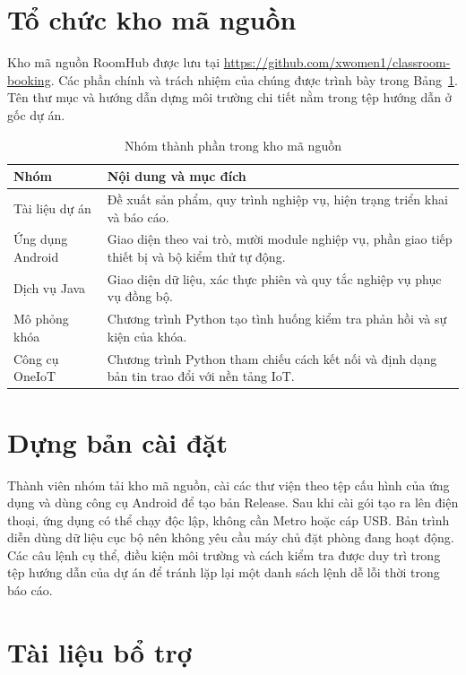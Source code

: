 \section{Tổ chức kho mã nguồn}

Kho mã nguồn RoomHub được lưu tại \url{https://github.com/xwomen1/classroom-booking}. Các phần chính và trách nhiệm của chúng được trình bày trong Bảng~\ref{tab:source-groups}. Tên thư mục và hướng dẫn dựng môi trường chi tiết nằm trong tệp hướng dẫn ở gốc dự án.

\begin{table}[H]
\centering
\caption{Nhóm thành phần trong kho mã nguồn}
\label{tab:source-groups}
\small
\begin{tabularx}{\textwidth}{>{\raggedright\arraybackslash}p{4.0cm} X}
\toprule
\rowcolor{RoomHubLight}
\textbf{Nhóm} & \textbf{Nội dung và mục đích} \\
\midrule
Tài liệu dự án & Đề xuất sản phẩm, quy trình nghiệp vụ, hiện trạng triển khai và báo cáo. \\
Ứng dụng Android & Giao diện theo vai trò, mười module nghiệp vụ, phần giao tiếp thiết bị và bộ kiểm thử tự động. \\
Dịch vụ Java & Giao diện dữ liệu, xác thực phiên và quy tắc nghiệp vụ phục vụ đồng bộ. \\
Mô phỏng khóa & Chương trình Python tạo tình huống kiểm tra phản hồi và sự kiện của khóa. \\
Công cụ OneIoT & Chương trình Python tham chiếu cách kết nối và định dạng bản tin trao đổi với nền tảng IoT. \\
\bottomrule
\end{tabularx}
\end{table}

\section{Dựng bản cài đặt}

Thành viên nhóm tải kho mã nguồn, cài các thư viện theo tệp cấu hình của ứng dụng và dùng công cụ Android để tạo bản Release. Sau khi cài gói tạo ra lên điện thoại, ứng dụng có thể chạy độc lập, không cần Metro hoặc cáp USB. Bản trình diễn dùng dữ liệu cục bộ nên không yêu cầu máy chủ đặt phòng đang hoạt động. Các câu lệnh cụ thể, điều kiện môi trường và cách kiểm tra được duy trì trong tệp hướng dẫn của dự án để tránh lặp lại một danh sách lệnh dễ lỗi thời trong báo cáo.

\section{Tài liệu bổ trợ}

